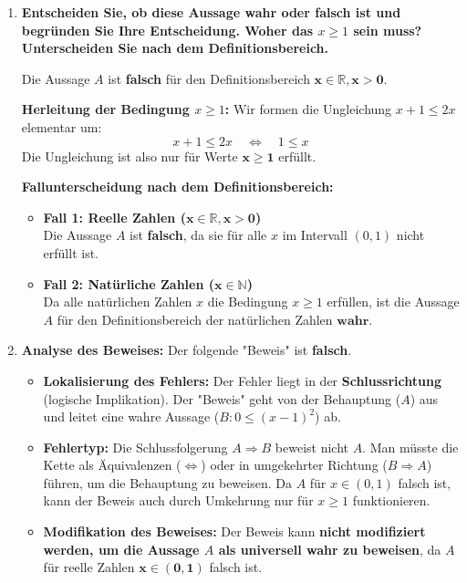 \documentclass{article}
\begin{document}
\begin{enumerate}[label=(\alph*)]
    \item \textbf{Entscheiden Sie, ob diese Aussage wahr oder falsch ist und begründen Sie Ihre Entscheidung. Woher das $x \geq 1$ sein muss? Unterscheiden Sie nach dem Definitionsbereich.}

          Die Aussage $A$ ist \textbf{falsch} für den Definitionsbereich $\mathbf{x \in \mathbb{R}, x > 0}$.

          \textbf{Herleitung der Bedingung $x \geq 1$:}
          Wir formen die Ungleichung $x+1 \leq 2x$ elementar um:
          \[
              x+1 \leq 2x \quad \iff \quad 1 \leq x
          \]
          Die Ungleichung ist also nur für Werte $\mathbf{x \geq 1}$ erfüllt.

          \textbf{Fallunterscheidung nach dem Definitionsbereich:}
          \begin{itemize}
              \item \textbf{Fall 1: Reelle Zahlen ($\mathbf{x \in \mathbb{R}, x > 0}$)} \\
                    Die Aussage $A$ ist \textbf{falsch}, da sie für alle $x$ im Intervall $(0, 1)$ nicht erfüllt ist.

              \item \textbf{Fall 2: Natürliche Zahlen ($\mathbf{x \in \mathbb{N}}$)} \\
                    Da alle natürlichen Zahlen $x$ die Bedingung $x \geq 1$ erfüllen, ist die Aussage $A$ für den Definitionsbereich der natürlichen Zahlen $\mathbf{wahr}$.
          \end{itemize}

    \item \textbf{Analyse des Beweises:}
          Der folgende "Beweis" ist \textbf{falsch}.
          \begin{itemize}
              \item \textbf{Lokalisierung des Fehlers:} Der Fehler liegt in der \textbf{Schlussrichtung} (logische Implikation). Der "Beweis" geht von der Behauptung ($A$) aus und leitet eine wahre Aussage ($B: 0 \leq (x-1)^2$) ab.

              \item \textbf{Fehlertyp:} Die Schlussfolgerung $A \Rightarrow B$ beweist nicht $A$. Man müsste die Kette als Äquivalenzen ($\iff$) oder in umgekehrter Richtung ($B \Rightarrow A$) führen, um die Behauptung zu beweisen. Da $A$ für $x \in (0, 1)$ falsch ist, kann der Beweis auch durch Umkehrung nur für $x \geq 1$ funktionieren.

              \item \textbf{Modifikation des Beweises:} Der Beweis kann \textbf{nicht modifiziert werden, um die Aussage $A$ als universell wahr zu beweisen}, da $A$ für reelle Zahlen $\mathbf{x \in (0, 1)}$ falsch ist.
          \end{itemize}
\end{enumerate}
\end{document}
